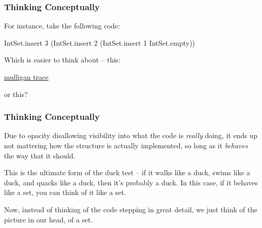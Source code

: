 \documentclass[aspectratio=169, handout]{beamer}
\begin{document}
\begin{frame}[fragile]
  \frametitle{Thinking Conceptually}

  For instance, take the following code:

  \pause
  \vspace{\fill}

  {\small
  \begin{codeblock}
    IntSet.insert 3 (IntSet.insert 2 (IntSet.insert 1 IntSet.empty))
  \end{codeblock}
  }

  \pause
  \vspace{\fill}

  Which is easier to think about -- this:

  \begin{center}
    {\color{blue} \href{https://asciinema.org/a/x3HwtfZyK6TYkDQ9eA1NztuVR}{mulligan trace}
    }
  \end{center}

  \pause
  or this?

  \begin{center}
  \end{center}
\end{frame}

\begin{frame}[fragile]
  \frametitle{Thinking Conceptually}

  Due to opacity disallowing visibility into what the code is \textit{really}
  doing, it ends up not mattering how the structure is actually implemented,
  so long as it \textit{behaves} the way that it should.

  \pause
  \vspace{\fill}

  This is the ultimate form of the duck test -- if it walks like a duck,
  swims like a duck, and quacks like a duck, then it's probably a duck. In this
  case, if it behaves like a set, you can think of it like a set.

  \pause
  \vspace{\fill}

  Now, instead of thinking of the code stepping in great detail, we just
  think of the picture in our head, of a set.
\end{frame}
\end{document}
